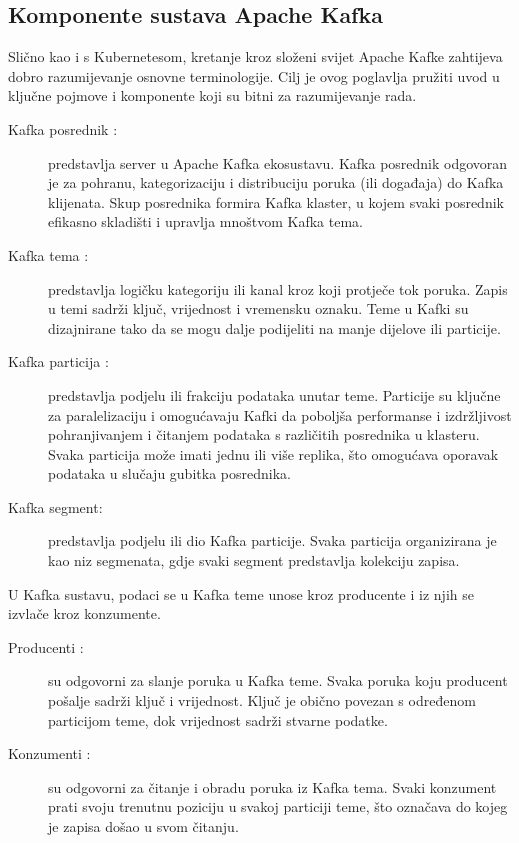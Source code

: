 \documentclass[times, utf8, diplomski]{fer}
\begin{document}
\subsection{Komponente sustava Apache Kafka}

Slično kao i s Kubernetesom, kretanje kroz složeni svijet Apache Kafke zahtijeva dobro razumijevanje osnovne terminologije. Cilj je ovog poglavlja pružiti uvod u ključne pojmove i komponente koji su bitni za razumijevanje rada.\\

\begin{description}
	\item[Kafka posrednik :] predstavlja server u Apache Kafka ekosustavu. Kafka posrednik odgovoran je za pohranu, kategorizaciju i distribuciju poruka (ili događaja) do Kafka klijenata. Skup posrednika formira Kafka klaster, u kojem svaki posrednik efikasno skladišti i upravlja mnoštvom Kafka tema.
	
	\item[Kafka tema :] predstavlja logičku kategoriju ili kanal kroz koji protječe tok poruka. Zapis u temi sadrži ključ, vrijednost i vremensku oznaku. Teme u Kafki su dizajnirane tako da se mogu dalje podijeliti na manje dijelove ili particije.
	
	\item[Kafka particija :] predstavlja podjelu ili frakciju podataka unutar teme. Particije su ključne za paralelizaciju i omogućavaju Kafki da poboljša performanse i izdržljivost pohranjivanjem i čitanjem podataka s različitih posrednika u klasteru. Svaka particija može imati jednu ili više replika, što omogućava oporavak podataka u slučaju gubitka posrednika.
	
	\item[Kafka segment:] predstavlja podjelu ili dio Kafka particije. Svaka particija organizirana je kao niz segmenata, gdje svaki segment predstavlja kolekciju zapisa.
\end{description}


U Kafka sustavu, podaci se u Kafka teme unose kroz producente i iz njih se izvlače kroz konzumente.

\begin{description}
	\item[Producenti :] su odgovorni za slanje poruka u Kafka teme. Svaka poruka koju producent pošalje sadrži ključ i vrijednost. Ključ je obično povezan s određenom particijom teme, dok vrijednost sadrži stvarne podatke.
	
	\item[Konzumenti :] su odgovorni za čitanje i obradu poruka iz Kafka tema. Svaki konzument prati svoju trenutnu poziciju  u svakoj particiji teme, što označava do kojeg je zapisa došao u svom čitanju.
\end{description}
\end{document}
